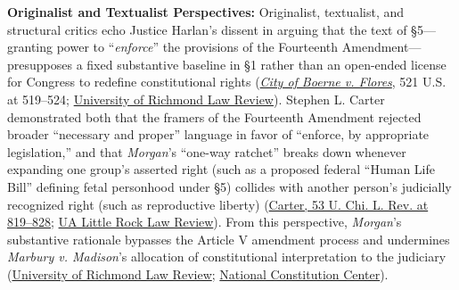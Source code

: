 \documentclass[12pt]{article}
\begin{document}
\textbf{Originalist and Textualist Perspectives:} Originalist, textualist, and structural critics echo Justice Harlan's dissent in arguing that the text of \S 5---granting power to ``\textit{enforce}'' the provisions of the Fourteenth Amendment---presupposes a fixed substantive baseline in \S 1 rather than an open-ended license for Congress to redefine constitutional rights (\href{https://supreme.justia.com/cases/federal/us/521/507/}{\textit{City of Boerne v. Flores}}, 521 U.S. at 519--524; \href{https://scholarship.richmond.edu/cgi/viewcontent.cgi?article=2278&context=lawreview}{University of Richmond Law Review}). Stephen L. Carter demonstrated both that the framers of the Fourteenth Amendment rejected broader ``necessary and proper'' language in favor of ``enforce, by appropriate legislation,'' and that \textit{Morgan}'s ``one-way ratchet'' breaks down whenever expanding one group's asserted right (such as a proposed federal ``Human Life Bill'' defining fetal personhood under \S 5) collides with another person's judicially recognized right (such as reproductive liberty) (\href{https://chicagounbound.uchicago.edu/context/uclrev/article/4477/viewcontent/53UChiLRev819.pdf}{Carter, 53 U. Chi. L. Rev. at 819--828}; \href{https://research.ualr.edu/cgi/viewcontent.cgi?article=1624&context=bowen_lawreview}{UA Little Rock Law Review}). From this perspective, \textit{Morgan}'s substantive rationale bypasses the Article V amendment process and undermines \textit{Marbury v. Madison}'s allocation of constitutional interpretation to the judiciary (\href{https://scholarship.richmond.edu/cgi/viewcontent.cgi?article=2278&context=lawreview}{University of Richmond Law Review}; \href{https://constitutioncenter.org/the-constitution/amendments/amendment-xiv/clauses/703}{National Constitution Center}).
\end{document}
